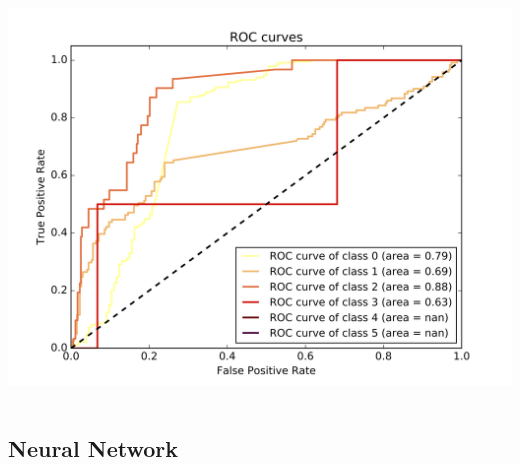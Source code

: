 \documentclass[c]{beamer}
\begin{document}
\begin{frame}
\begin{columns}
\begin{column}{0.6\textwidth}
      \centering\vfill
      \includegraphics[scale=0.18]{../../data/Pays-Bas/test/Support_Vector_Gaussian_Classification/Support_Vector_Gaussian_Classification_roc.png}
\end{column}
\end{columns}
\end{frame}



\subsection{Neural Network}
\begin{frame}
\tableofcontents[currentsubsection]
\end{frame}
\end{document}
